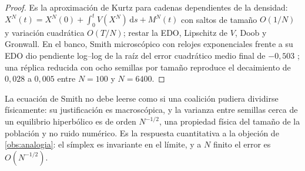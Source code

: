 \begin{proof}
Es la aproximación de Kurtz para cadenas dependientes de la densidad:
$X^N(t)=X^N(0)+\int_0^tV(X^N)\,\mathrm ds+M^N(t)$ con saltos de tamaño
$O(1/N)$ y variación cuadrática $O(T/N)$; restar la EDO, Lipschitz de $V$,
Doob y Gronwall. En el banco, Smith microscópico con relojes exponenciales
frente a su EDO dio pendiente log--log de la raíz del error cuadrático medio
final de $-0{,}503$ \cite{mayorga2026compendio}; una réplica reducida con
ocho semillas por tamaño reproduce el decaimiento de $0{,}028$ a $0{,}005$
entre $N=100$ y $N=6400$.
\end{proof}

\begin{observacion}
\label{obs:edo-macroscopica}
La ecuación de Smith no debe leerse como si una coalición pudiera dividirse
físicamente: su justificación es macroscópica, y la varianza entre semillas
cerca de un equilibrio hiperbólico es de orden $N^{-1/2}$, una propiedad
física del tamaño de la población y no ruido numérico. Es la respuesta
cuantitativa a la objeción de \cref{obs:analogia}: el símplex es invariante
en el límite, y a $N$ finito el error es $O(N^{-1/2})$.
\end{observacion}
